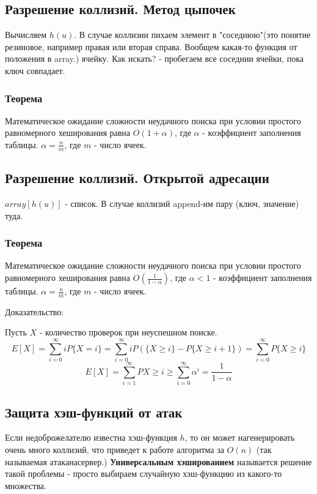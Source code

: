 \subsection*{Разрешение коллизий. Метод цыпочек}
Вычисляем $h(u)$. В случае коллизии пихаем элемент в "соседнюю"(это понятие резиновое, например правая или вторая справа. Вообщем какая-то функция от положения в array.) ячейку.
Как искать? - пробегаем все соседнии ячейки, пока ключ совпадает.

\subsubsection*{Теорема}
Математическое ожидание сложности неудачного поиска
при условии простого равномерного хеширования равна
$O(1 + \alpha)$, где $\alpha$ - коэффициент заполнения таблицы.
$\alpha = \frac{n}{m}$, где $m$ - число ячеек. 

\subsection*{Разрешение коллизий. Открытой адресации}
$array[h(u)]$ - список. В случае коллизий append-им пару (ключ, значение) туда.


\subsubsection*{Теорема}
Математическое ожидание сложности неудачного поиска
при условии простого равномерного хеширования равна
$O(\frac{1}{1-\alpha})$, где $\alpha < 1$ - коэффициент заполнения таблицы.
$\alpha = \frac{n}{m}$, где $m$ - число ячеек. 

Доказательство:

Пусть $X$ - количество проверок при неуспешном поиске.
$$E[X] = \sum\limits_{i=0}^{\infty}iP\{X = i\} = \sum\limits_{i=0}^{\infty}iP(\{X\ge i\} - P\{X\ge i+1\}) = \sum\limits_{i=0}^{\infty}P\{X \ge i\}$$
$$E[X] = \sum\limits_{i=1}^{\infty}P{X \ge i}\ge\sum\limits_{i=0}^{\infty}\alpha^i = \frac{1}{1-\alpha}$$ 

\subsection*{Защита хэш-функций от атак}
Если недоброжелателю известна хэш-функция $h$, то он может нагенерировать очень много коллизий, что приведет к работе алгоритма за $O(n)$ (так называемая $атака на сервер.$)
{\bf Универсальным хэшированием} называется решение такой проблемы - просто выбираем случайную хэш-функцию из какого-то множества.
